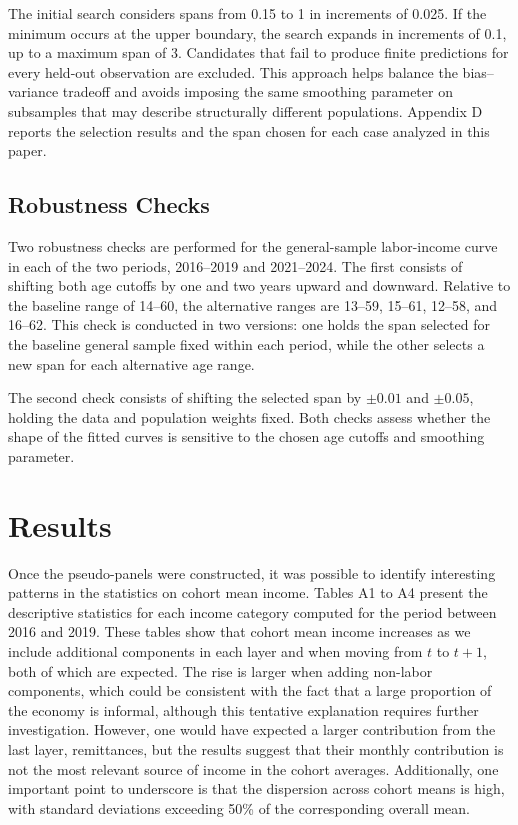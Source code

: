 \documentclass{article}
\begin{document}
The initial search considers spans from 0.15 to 1 in increments of 0.025. If the minimum occurs at the upper boundary, the search expands in increments of 0.1, up to a maximum span of 3. Candidates that fail to produce finite predictions for every held-out observation are excluded. This approach helps balance the bias--variance tradeoff and avoids imposing the same smoothing parameter on subsamples that may describe structurally different populations. Appendix D reports the selection results and the span chosen for each case analyzed in this paper.

\subsection{Robustness Checks}

Two robustness checks are performed for the general-sample labor-income curve in each of the two periods, 2016--2019 and 2021--2024. The first consists of shifting both age cutoffs by one and two years upward and downward. Relative to the baseline range of 14--60, the alternative ranges are 13--59, 15--61, 12--58, and 16--62. This check is conducted in two versions: one holds the span selected for the baseline general sample fixed within each period, while the other selects a new span for each alternative age range.

The second check consists of shifting the selected span by $\pm 0.01$ and $\pm 0.05$, holding the data and population weights fixed. Both checks assess whether the shape of the fitted curves is sensitive to the chosen age cutoffs and smoothing parameter.

\section{Results}

Once the pseudo-panels were constructed, it was possible to identify interesting patterns in the statistics on cohort mean income. Tables A1 to A4 present the descriptive statistics for each income category computed for the period between 2016 and 2019. These tables show that cohort mean income increases as we include additional components in each layer and when moving from $t$ to $t+1$, both of which are expected. The rise is larger when adding non-labor components, which could be consistent with the fact that a large proportion of the economy is informal, although this tentative explanation requires further investigation. However, one would have expected a larger contribution from the last layer, remittances, but the results suggest that their monthly contribution is not the most relevant source of income in the cohort averages. Additionally, one important point to underscore is that the dispersion across cohort means is high, with standard deviations exceeding 50\% of the corresponding overall mean.
\end{document}
